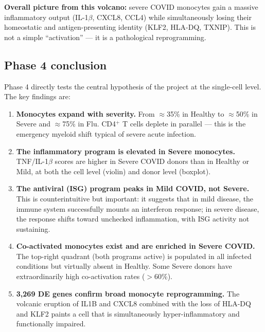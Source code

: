 \documentclass[11pt, a4paper]{article}
\begin{document}
\textbf{Overall picture from this volcano:} severe COVID monocytes gain a massive
inflammatory output (IL-1$\beta$, CXCL8, CCL4) while simultaneously losing their
homeostatic and antigen-presenting identity (KLF2, HLA-DQ, TXNIP). This is not
a simple ``activation'' — it is a pathological reprogramming.

\subsection{Phase 4 conclusion}

Phase 4 directly tests the central hypothesis of the project at the single-cell level.
The key findings are:

\begin{enumerate}[nosep]
  \item \textbf{Monocytes expand with severity.}
        From $\approx$35\% in Healthy to $\approx$50\% in Severe and $\approx$75\%
        in Flu. CD4$^+$ T cells deplete in parallel — this is the emergency myeloid
        shift typical of severe acute infection.

  \item \textbf{The inflammatory program is elevated in Severe monocytes.}
        TNF/IL-1$\beta$ scores are higher in Severe COVID donors than in Healthy
        or Mild, at both the cell level (violin) and donor level (boxplot).

  \item \textbf{The antiviral (ISG) program peaks in Mild COVID, not Severe.}
        This is counterintuitive but important: it suggests that in mild disease,
        the immune system successfully mounts an interferon response; in severe
        disease, the response shifts toward unchecked inflammation, with ISG
        activity not sustaining.

  \item \textbf{Co-activated monocytes exist and are enriched in Severe COVID.}
        The top-right quadrant (both programs active) is populated in all infected
        conditions but virtually absent in Healthy. Some Severe donors have
        extraordinarily high co-activation rates ($>$60\%).

  \item \textbf{3,269 DE genes confirm broad monocyte reprogramming.}
        The volcanic eruption of IL1B and CXCL8 combined with the loss of HLA-DQ
        and KLF2 paints a cell that is simultaneously hyper-inflammatory and
        functionally impaired.
\end{enumerate}
\end{document}
